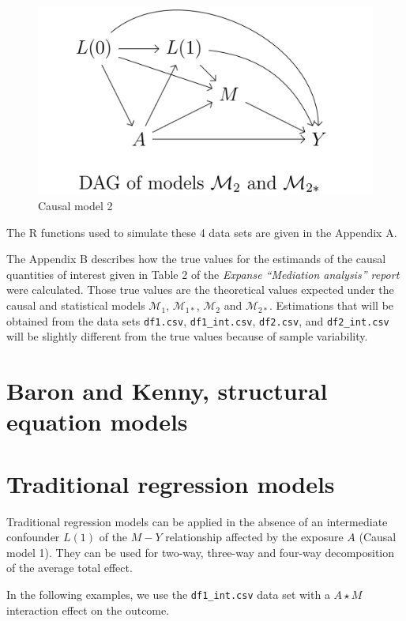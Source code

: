 \documentclass[
]{book}
\begin{document}
\begin{figure}

{\centering \includegraphics[width=0.5\linewidth]{./figures/DAG_M2} 

}

\caption{Causal model 2}\label{fig:figDAGM2}
\end{figure}

The R functions used to simulate these 4 data sets are given in the Appendix A.

The Appendix B describes how the true values for the estimands of the causal quantities of interest given in Table 2 of the \emph{Expanse ``Mediation analysis'' report} were calculated. Those true values are the theoretical values expected under the causal and statistical models \(\mathcal{M}_1\), \(\mathcal{M}_{1 \ast}\), \(\mathcal{M}_2\) and \(\mathcal{M}_{2 \ast}\). Estimations that will be obtained from the data sets \texttt{df1.csv}, \texttt{df1\_int.csv}, \texttt{df2.csv}, and \texttt{df2\_int.csv} will be slightly different from the true values because of sample variability.

\hypertarget{ChapBaronKennySem}{%
\chapter{Baron and Kenny, structural equation models}\label{ChapBaronKennySem}}

\hypertarget{ChapTradRegModels}{%
\chapter{Traditional regression models}\label{ChapTradRegModels}}

Traditional regression models can be applied in the absence of an intermediate confounder \(L(1)\) of the \(M-Y\) relationship affected by the exposure \(A\) (Causal model 1). They can be used for two-way, three-way and four-way decomposition of the average total effect.

In the following examples, we use the \texttt{df1\_int.csv} data set with a \(A \star M\) interaction effect on the outcome.
\end{document}
